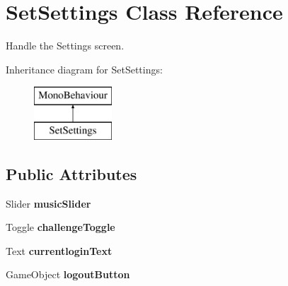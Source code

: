 \hypertarget{class_set_settings}{}\section{Set\+Settings Class Reference}
\label{class_set_settings}


Handle the Settings screen.  


Inheritance diagram for Set\+Settings\+:\begin{figure}[H]
\begin{center}
\leavevmode
\includegraphics[height=2.000000cm]{class_set_settings}
\end{center}
\end{figure}
\subsection*{Public Attributes}
\begin{DoxyCompactItemize}
\item 
\mbox{\label{class_set_settings_a641871cf47ac0056a4ee213ed3d787b4}} 
Slider {\bfseries music\+Slider}
\item 
\mbox{\label{class_set_settings_aa1d76df5c31261919a7132d81471a7b0}} 
Toggle {\bfseries challenge\+Toggle}
\item 
\mbox{\label{class_set_settings_a8cb995fa0671cc73dbe7ada21f371e5a}} 
Text {\bfseries currentlogin\+Text}
\item 
\mbox{\label{class_set_settings_adeb813cf570d93ebae34e126df46ff68}} 
Game\+Object {\bfseries logout\+Button}
\end{DoxyCompactItemize}

